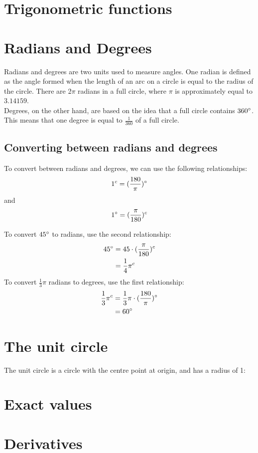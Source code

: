 \documentclass{book}
\newcommand{\rad}{^{c}}
\begin{document}
\chapter{Trigonometric functions}
\chapter{Radians and Degrees}

Radians and degrees are two units used to measure angles.  One radian is defined as the angle formed when the length of an arc on a circle is equal to the radius of the circle. There are 2$\pi$ radians in a full circle, where $\pi$ is approximately equal to $3.14159$.\\

Degrees, on the other hand, are based on the idea that a full circle contains $360\degree$. This means that one degree is equal to $\frac{1}{360}$ of a full circle.\\


\section{Converting between radians and degrees}
To convert between radians and degrees, we can use the following relationships:
\[
	1\rad = ({\frac{180}{\pi}})\degree
\]
and
\[
	1\degree = (\frac{\pi}{180})\rad
\]


To convert $45\degree$ to radians, use the second relationship:
\begin{align*}
	45\degree & = 45 \cdot (\frac{\pi}{180})\rad \\
	          & = \frac{1}{4}\pi\rad
\end{align*}
To convert $\frac{1}{3}\pi$ radians to degrees, use the first relationship:
\begin{align*}
	\frac{1}{3}\pi\rad & = \frac{1}{3}\pi \cdot (\frac{180}{\pi})\degree \\
	                   & = 60\degree
\end{align*}

\chapter{The unit circle}
The unit circle is a circle with the centre point at origin, and has a radius of 1:
\begin{center}
\end{center}


\chapter{Exact values}

\chapter{Derivatives}
\end{document}
